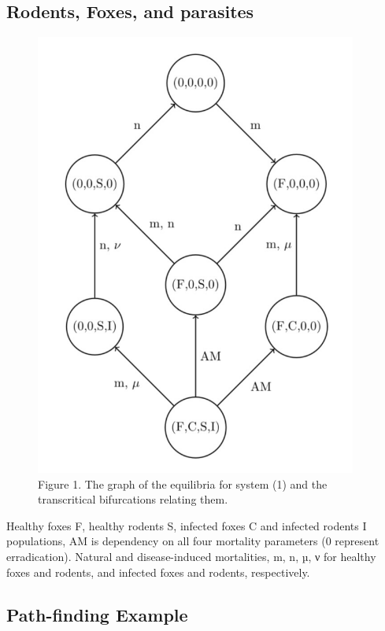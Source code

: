 \documentclass[
  letterpaper,
  DIV=11,
  numbers=noendperiod]{scrartcl}
\begin{document}
\subsection{Rodents, Foxes, and
parasites}\label{rodents-foxes-and-parasites}

\begin{figure}[H]

{\centering \includegraphics[width=4.16667in,height=\textheight]{images/DP_foxes.png}

}

\caption{Figure 1. The graph of the equilibria for system (1) and the
transcritical bifurcations relating them.}

\end{figure}%

Healthy foxes F, healthy rodents S, infected foxes C and infected
rodents I populations, AM is dependency on all four mortality parameters
(0 represent erradication). Natural and disease-induced mortalities, m,
n, µ, ν for healthy foxes and rodents, and infected foxes and rodents,
respectively.

\subsection{Path-finding Example}\label{path-finding-example}
\end{document}

